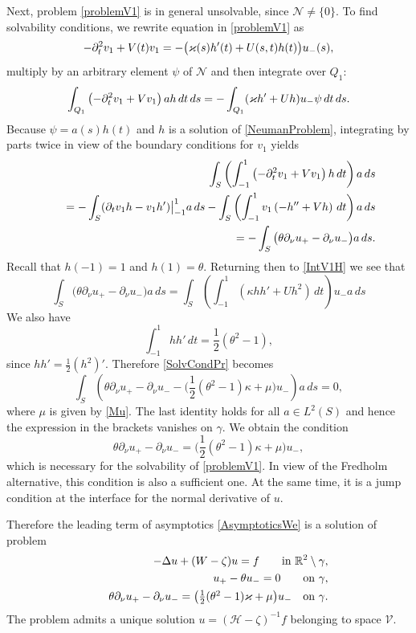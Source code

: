 Next, problem \eqref{problemV1} is in general unsolvable, since $\mathcal{N}\neq\{0\}$.  To find solvabi\-li\-ty conditions, we rewrite  equation in \eqref{problemV1} as
\begin{equation}\label{eqnV1Expand}
  -\partial_t^2 v_1+V(t)v_1=-\big(\varkappa(s)h'(t)+U(s,t)h(t)\big)u_-(s),
\end{equation}
multiply  by an arbitrary element $\psi$ of  $\mathcal{N}$  and then integrate over $Q_1$:
\begin{equation}\label{IntV1H}
\int_{Q_1}\left(-\partial_t^2 v_1+Vv_1\right)ah\,dt\,ds=
-\int_{Q_1}(\varkappa h'+Uh )u_-\psi\, dt\,ds.
\end{equation}
Because $\psi=a(s)h(t)$ and $h$ is a solution of \eqref{NeumanProblem}, integrating by parts twice  in view of the boundary conditions for $v_1$ yields
\begin{eqnarray}\nonumber
&&\int_{S} \left(\int_{-1}^1\left(-\partial_t^2 v_1+Vv_1\right)h\,dt \right) a\,ds\\\nonumber
&&\kern12pt=-\int_{S}( \partial_tv_1 h-v_1 h')\big|_{-1}^1a\,ds-
\int_{S} \left(\int_{-1}^1 v_1\left(-h''+Vh\right)\,dt \right) a\,ds\\\nonumber
&&\kern12pt=-\int_{S}\big(\theta\partial_\nu u_+-\partial_\nu u_-\big) a\,ds.
\end{eqnarray}
Recall that $h(-1)=1$ and $h(1)=\theta$. Returning then to \eqref{IntV1H} we see that
\begin{equation}\label{SolvCondPr}
\int_{S}\big(\theta\partial_\nu u_+-\partial_\nu u_-\big) a\,ds=
\int_{S} \left(\int_{-1}^1 \left(\kappa hh'+Uh^2\right)\,dt \right) u_-a\,ds
\end{equation}
We also have
$$
  \int_{-1}^1hh'\,d t=\textstyle\frac{1}{2 }(\theta^2-1),
$$
since $hh'=\frac12 (h^2)'$. Therefore \eqref{SolvCondPr} becomes
$$
\int_{S}\left(\theta\partial_\nu u_+-\partial_\nu u_--\big(\textstyle\frac{1}{2}(\theta^2-1)\kappa+\mu \big)u_-\right)a\,ds= 0,
$$
where $\mu$ is given by \eqref{Mu}.
The last identity holds for all $a\in L^2(S)$ and hence  the expression in the brackets vanishes on $\gamma$. We obtain  the  condition
$$
  \theta\partial_\nu u_+-\partial_\nu u_-
=\big(\textstyle\frac{1}{2}(\theta^2-1)\kappa+\mu \big) u_-,
$$
which is necessary for the solvability of \eqref{problemV1}.
In view of the Fredholm alternative, this condition is also a sufficient one. At the same time, it is a jump condition at the interface for the normal derivative of $u$.

Therefore the leading term of asymptotics \eqref{AsymptoticsWe} is a solution of problem
\begin{eqnarray}\label{LimitProblemEq}
&&-\Delta u+(W-\zeta)u=f \qquad \hbox{in  } \mathbb R^2\setminus \gamma,
\\ \label{RCond0}
 &&\phantom{-}u_+-\theta u_-=0  \qquad \hbox{on } \gamma,
\\ \label{RCond1}
&&\phantom{-}\theta\partial_\nu u_+-\partial_\nu u_-
=\big(\textstyle\frac{1}{2}(\theta^2-1)\varkappa+\mu \big) u_- \quad \hbox{on } \gamma.
\end{eqnarray}
The problem admits a unique solution $u=(\mathcal{H}-\zeta)^{-1}f$ belonging to space $\mathcal{V}$.

